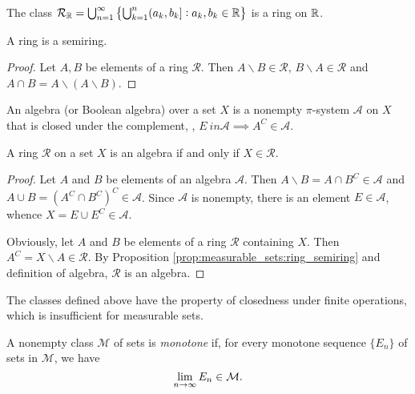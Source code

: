 \begin{example}
The class $\mathcal{R}_{\mathbb{R}} = \bigcup_{n=1}^\infty 
\left\{ \bigcup_{k=1}^n (a_k, b_k]: a_k, b_k \in \mathbb{R} \right\}$ is a ring on 
$\mathbb{R}$. 
\end{example}

\begin{prop}
\label{prop:measurable_sets:ring_semiring}
A ring is a semiring. 
\end{prop}
\begin{proof}
Let $A, B$ be elements of a ring $\mathcal{R}$. 
Then $A \backslash B \in \mathcal{R}$, $B \backslash A \in \mathcal{R}$ and 
$A \cap B = A \backslash (A \backslash B)$. 
\end{proof}
\begin{defn}
An algebra (or Boolean algebra) over a set $X$ is a nonempty $\pi$-system 
$\mathcal{A}$ on $X$ that is closed under the complement, \ie, 
$E\ in \mathcal{A} \implies A^C \in \mathcal{A}$. 
\end{defn}

\begin{prop}
\label{prop:measurable_sets:ring_algebra}
A ring $\mathcal{R}$ on a set $X$ is an algebra if and only if 
$X \in \mathcal{R}$.
\end{prop}
\begin{proof}
Let $A$ and $B$ be elements of an algebra $\mathcal{A}$. 
Then $A \backslash B = A \cap B^C \in \mathcal{A}$ and $A \cup B = 
\left( A^C \cap B^C \right)^C \in \mathcal{A}$. 
Since $\mathcal{A}$ is nonempty, there is an element $E \in \mathcal{A}$, 
whence $X = E \cup E^C \in \mathcal{A}$. 

Obviously, let $A$ and $B$ be elements of a ring $\mathcal{R}$ containing 
$X$. 
Then $A^C = X \backslash A \in \mathcal{R}$. 
By Proposition \ref{prop:measurable_sets:ring_semiring} and definition of 
algebra, $\mathcal{R}$ is an algebra. 
\end{proof}

The classes defined above have the property of closedness under finite 
operations, which is insufficient for measurable sets. 
\begin{defn}
A nonempty class $\mathcal{M}$ of sets is \emph{monotone} if, for every 
monotone sequence $\{E_n\}$ of sets in $\mathcal{M}$, we have 
\begin{equation*}
    \lim_{n \to \infty} E_n \in \mathcal{M}. 
\end{equation*}
\end{defn}

